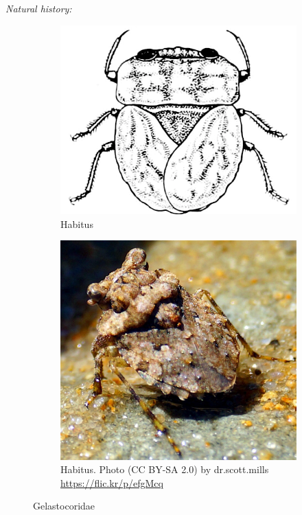 \documentclass[letterpaper, 11pt]{article}
\begin{document}
\noindent{}\textit{Natural history:} \\

\begin{figure}[ht!]
 \centering
 \begin{subfigure}[ht!]{0.35\textwidth}
  \includegraphics[width=\textwidth]{GelastocoridHabitusInk}
  \caption{Habitus \citep[][Plate XXXII, Fig. 10]{bhl82061}}
  \label{fig:gelasto1}
 \end{subfigure}
 \qquad
 \begin{subfigure}[ht!]{0.32\textwidth}
  \includegraphics[width=\textwidth]{GelastocoridHabitus}
  \caption{Habitus. Photo (CC BY-SA 2.0) by dr.scott.mills \url{https://flic.kr/p/efgMcq}}
  \label{fig:gelasto2}
 \end{subfigure}
 \caption{Gelastocoridae}\label{fig:gelastocorids}
\end{figure}
\end{document}

